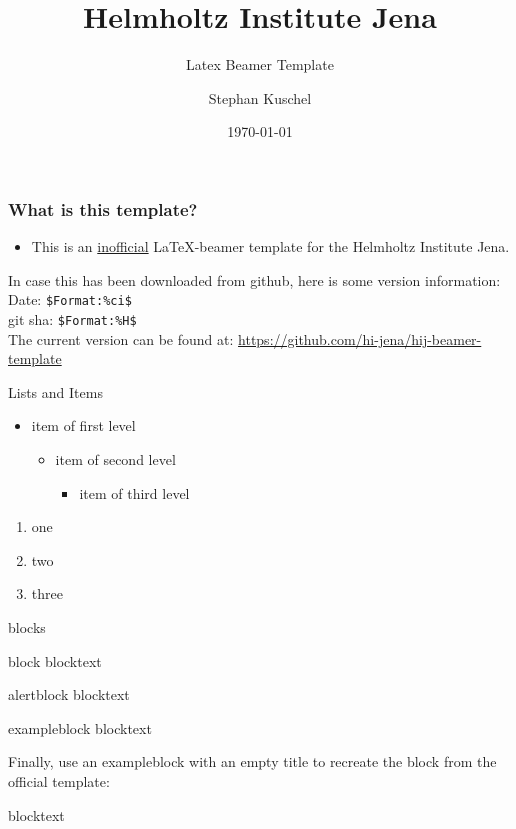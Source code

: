 \documentclass{beamer}
\title{Helmholtz Institute Jena}
\subtitle{Latex Beamer Template}
\author{Stephan Kuschel}
\institute{Helmholtz Institute Jena}
\date{\today}
\begin{document}
\frame{\titlepage}


\begin{frame}[fragile]
\frametitle{What is this template?}
\begin{itemize}
\item This is an \underline{inofficial} \LaTeX-beamer template for the Helmholtz Institute Jena.
\end{itemize}
In case this has been downloaded from github, here is some version information: \\
Date: \verb|$Format:%ci$| \\
git sha: \verb|$Format:%H$| \\[1em]
The current version can be found at:
\url{https://github.com/hi-jena/hij-beamer-template}
\end{frame}


\begin{frame}{Lists and Items}
  \begin{itemize}
    \item item of first level
    \begin{itemize}
      \item item of second level
      \begin{itemize}
        \item item of third level
      \end{itemize}
    \end{itemize}
  \end{itemize}
  \begin{enumerate}
    \item one
    \item two
    \item three
  \end{enumerate}
\end{frame}

\begin{frame}{blocks}
\begin{block}{block}
  blocktext
\end{block}

\begin{alertblock}{alertblock}
  blocktext
\end{alertblock}

\begin{exampleblock}{exampleblock}
  blocktext
\end{exampleblock}

Finally, use an exampleblock with an empty title to recreate the block from the official template:
\begin{exampleblock}{}
  blocktext
\end{exampleblock}
\end{frame}
\end{document}
